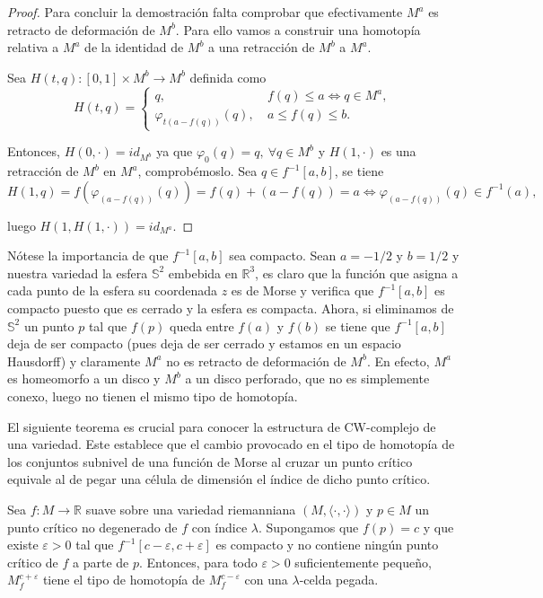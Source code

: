 \begin{proof}
     Para concluir la demostración falta comprobar que efectivamente $M^a$ es retracto de deformación de $M^b$. Para ello vamos a construir una homotopía relativa a $M^a$ de la identidad de $M^b$ a una retracción de $M^b$ a $M^a$.
     
    Sea $H(t,q):[0,1]\times M^b\to M^b$ definida como
    \begin{equation*}
        H(t,q)=
        \begin{cases}
            q,&~f(q)\le a\iff q\in M^a,\\
            \varphi_{t(a-f(q))}(q),&~a\le f(q)\le b.
        \end{cases}
    \end{equation*}

    Entonces, $H(0,\cdot) = id_{M^b}$ ya que $\varphi_0(q)=q,~\forall q\in M^b$ y $H(1,\cdot)$ es una retracción de $M^b$ en $M^a$, comprobémoslo. Sea $q\in f^{-1}[a,b]$, se tiene
    \begin{equation*}
        H(1,q)=f(\varphi_{(a-f(q))}(q))= f(q)+(a-f(q))= a \iff \varphi_{(a-f(q))}(q)\in f^{-1}(a),
    \end{equation*}

    luego $H(1,H(1,\cdot))= id_{M^a}$.    

\end{proof}
\begin{remark}
    Nótese la importancia de que $f^{-1}[a,b]$ sea compacto. Sean $a=-1/2$ y $b=1/2$ y nuestra variedad la esfera $\mathbb{S}^2$ embebida en $\mathbb{R}^3$, es claro que la función que asigna a cada punto de la esfera su coordenada $z$ es de Morse y verifica que $f^{-1}[a,b]$ es compacto puesto que es cerrado y la esfera es compacta. Ahora, si eliminamos de $\mathbb{S}^2$ un punto $p$ tal que $f(p)$ queda entre $f(a)$ y $f(b)$ se tiene que $f^{-1}[a,b]$ deja de ser compacto (pues deja de ser cerrado y estamos en un espacio Hausdorff) y claramente $M^a$ no es retracto de deformación de $M^b$. En efecto, $M^a$ es homeomorfo a un disco y $M^b$ a un disco perforado, que no es simplemente conexo, luego no tienen el mismo tipo de homotopía.
\end{remark}
\bigskip

El siguiente teorema es crucial para conocer la estructura de CW-complejo de una variedad. Este establece que el cambio provocado en el tipo de homotopía de los conjuntos subnivel de una función de Morse al cruzar un punto crítico equivale al de pegar una célula de dimensión el índice de dicho punto crítico.

\begin{theorem}
\label{pegadocelula}
     Sea $f:M\to\mathbb{R}$ suave sobre una variedad riemanniana $(M,\langle\cdot,\cdot\rangle)$ y $p\in M$ un punto crítico no degenerado de $f$ con índice $\lambda$. Supongamos que $f(p)=c$ y que existe $\varepsilon>0$ tal que $f^{-1}[c-\varepsilon,c+\varepsilon]$ es compacto y no contiene ningún punto crítico de $f$ a parte de $p$. Entonces, para todo $\varepsilon>0$ suficientemente pequeño, $M^{c+\varepsilon}_f$ tiene el tipo de homotopía de $M^{c-\varepsilon}_f$ con una $\lambda$-celda pegada.
\end{theorem}

